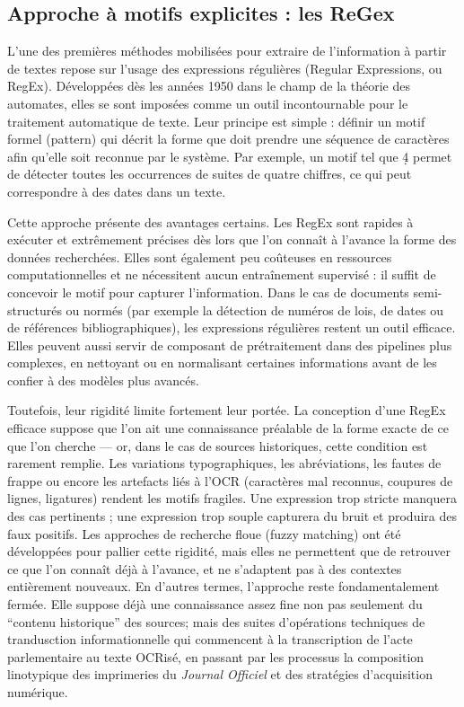 \subsection{Approche à motifs explicites : les ReGex}

L’une des premières méthodes mobilisées pour extraire de l’information à partir de textes repose sur l’usage des expressions régulières (Regular Expressions, ou RegEx). Développées dès les années 1950 dans le champ de la théorie des automates, elles se sont imposées comme un outil incontournable pour le traitement automatique de texte. Leur principe est simple : définir un motif formel (pattern) qui décrit la forme que doit prendre une séquence de caractères afin qu’elle soit reconnue par le système. Par exemple, un motif tel que \d{4} permet de détecter toutes les occurrences de suites de quatre chiffres, ce qui peut correspondre à des dates dans un texte.

Cette approche présente des avantages certains. Les RegEx sont rapides à exécuter et extrêmement précises dès lors que l’on connaît à l’avance la forme des données recherchées. Elles sont également peu coûteuses en ressources computationnelles et ne nécessitent aucun entraînement supervisé : il suffit de concevoir le motif pour capturer l’information. Dans le cas de documents semi-structurés ou normés (par exemple la détection de numéros de lois, de dates ou de références bibliographiques), les expressions régulières restent un outil efficace. Elles peuvent aussi servir de composant de prétraitement dans des pipelines plus complexes, en nettoyant ou en normalisant certaines informations avant de les confier à des modèles plus avancés.

Toutefois, leur rigidité limite fortement leur portée. La conception d’une RegEx efficace suppose que l’on ait une connaissance préalable de la forme exacte de ce que l’on cherche — or, dans le cas de sources historiques, cette condition est rarement remplie. Les variations typographiques, les abréviations, les fautes de frappe ou encore les artefacts liés à l’OCR (caractères mal reconnus, coupures de lignes, ligatures) rendent les motifs fragiles. Une expression trop stricte manquera des cas pertinents ; une expression trop souple capturera du bruit et produira des faux positifs. Les approches de recherche floue (fuzzy matching) ont été développées pour pallier cette rigidité, mais elles ne permettent que de retrouver ce que l’on connaît déjà à l’avance, et ne s’adaptent pas à des contextes entièrement nouveaux. En d’autres termes, l’approche reste fondamentalement fermée. Elle suppose déjà une connaissance assez fine non pas seulement du \enquote{contenu historique} des sources; mais des suites d'opérations techniques de trandusction informationnelle qui commencent à la transcription de l'acte parlementaire au texte OCRisé, en passant par les processus la composition linotypique des imprimeries du \emph{Journal Officiel} et des stratégies d'acquisition numérique.

